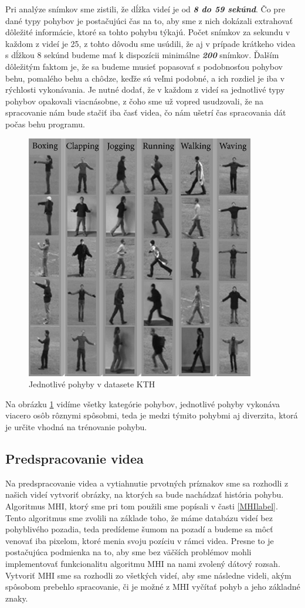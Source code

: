Pri analýze snímkov sme zistili, že dĺžka videí je od \textit{\textbf{8 do 59 sekúnd}}. Čo pre dané typy pohybov je postačujúci čas na to, aby sme z nich dokázali extrahovať dôležité informácie, ktoré sa tohto pohybu týkajú.  Počet snímkov za sekundu v každom z videí je 25, z tohto dôvodu sme usúdili, že aj v prípade krátkeho videa s dĺžkou 8 sekúnd budeme mať k dispozícii minimálne \textit{\textbf{200}} snímkov. Ďalším dôležitým faktom je, že sa budeme musieť popasovať s podobnosťou pohybov behu, pomalého behu a chôdze, keďže sú veľmi podobné, a ich rozdiel je iba v rýchlosti vykonávania. Je nutné dodať, že v každom z videí sa jednotlivé typy pohybov opakovali viacnásobne, z čoho sme už vopred usudzovali, že na spracovanie nám bude stačiť iba časť videa, čo nám ušetrí čas spracovania dát počas behu programu. 

\begin{figure}[H]
  \centering
  \includegraphics[width=10cm]{img/KTHdataset.png}
  \caption{Jednotlivé pohyby v datasete KTH \cite{c14}}
  \label{KTHobr}
\end{figure}

Na obrázku \ref{KTHobr} vidíme všetky kategórie pohybov, jednotlivé pohyby vykonáva viacero osôb rôznymi spôsobmi, teda je medzi týmito pohybmi aj diverzita, ktorá je určite vhodná na trénovanie pohybu. 

\subsection{Predspracovanie videa}
Na predspracovanie videa a vytiahnutie prvotných príznakov sme sa rozhodli z našich videí vytvoriť obrázky, na ktorých sa bude nachádzať história pohybu. Algoritmus MHI, ktorý sme pri tom použili sme popísali v časti \ref{MHIlabel}. Tento algoritmus sme zvolili na základe toho, že máme databázu videí bez pohyblivého pozadia, teda predídeme šumom na pozadí a budeme sa môcť venovať iba pixelom, ktoré menia svoju pozíciu v rámci videa. Presne to je postačujúca podmienka na to, aby sme bez väčších problémov mohli implementovať funkcionalitu algoritmu MHI na nami zvolený dátový rozsah. Vytvoriť MHI sme sa rozhodli zo všetkých videí, aby sme následne videli, akým spôsobom prebehlo spracovanie, či je možné z MHI vyčítať pohyb a jeho základné znaky. 

